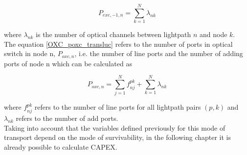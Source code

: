 \begin{equation}
P_{exc,-1,n} = \sum_{k=1}^{N} \lambda_{nk}
\label{EXC_pexc2_transluc}
\end{equation}

\noindent
where $\lambda_{nk}$ is the number of optical channels between lightpath $n$ and node $k$.\\

The equation \ref{OXC_poxc_transluc} refers to the number of ports in optical switch in node n, $P_{oxc,n}$, i.e. the number of line ports and the number of adding ports of node n which can be calculated as

\begin{equation}
P_{oxc,n} = \sum_{j=1}^{N} f_{nj}^{pk} + \sum_{k=1}^{N} \lambda_{nk}
\label{OXC_poxc_transluc}
\end{equation}

\noindent
where $f_{nj}^{pk}$ refers to the number of line ports for all lightpath pairs $(p,k)$ and $\lambda_{nk}$ refers to the number of add ports.\\

Taking into account that the variables defined previously for this mode of transport depend on the mode of survivability, in the following chapter it is already possible to calculate CAPEX.\\

